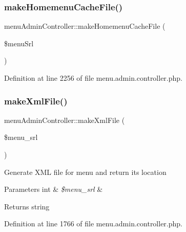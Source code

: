 \subsubsection{\texorpdfstring{make\+Homemenu\+Cache\+File()}{makeHomemenuCacheFile()}}
{\footnotesize\ttfamily menu\+Admin\+Controller\+::make\+Homemenu\+Cache\+File (\begin{DoxyParamCaption}\item[{}]{\$menu\+Srl }\end{DoxyParamCaption})}



Definition at line 2256 of file menu.\+admin.\+controller.\+php.

\mbox{\label{classmenuAdminController_a1635d4c0dc3ace9e475422f9280e615e}} 
\subsubsection{\texorpdfstring{make\+Xml\+File()}{makeXmlFile()}}
{\footnotesize\ttfamily menu\+Admin\+Controller\+::make\+Xml\+File (\begin{DoxyParamCaption}\item[{}]{\$menu\+\_\+srl }\end{DoxyParamCaption})}

Generate X\+ML file for menu and return its location 
\begin{DoxyParams}[1]{Parameters}
int & {\em \$menu\+\_\+srl} & \\
\hline
\end{DoxyParams}
\begin{DoxyReturn}{Returns}
string 
\end{DoxyReturn}


Definition at line 1766 of file menu.\+admin.\+controller.\+php.

\mbox{\label{classmenuAdminController_af8dacd19919e854dbe083b602ea0f183}} 
